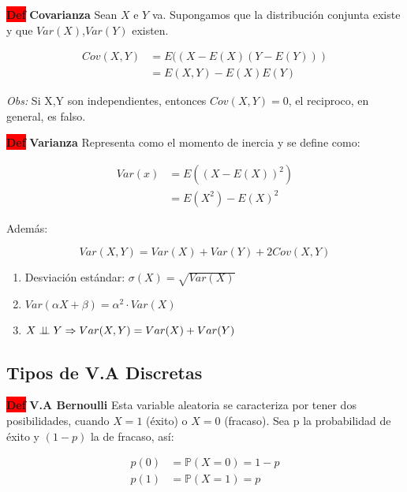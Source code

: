 \documentclass[letterpaper,10.5pt,twocolumn]{article} %
\newcommand{\Proba}{\mathbb{P} }
\newcommand{\hlc}[2][yellow]{ \colorbox{#1}{#2} }
\newcommand{\Def}{\hlc[red]{\bfseries Def}}
\newcommand{\independent}{\perp\mkern-9.5mu\perp}
\begin{document}
\Def \textbf{Covarianza} Sean $X$ e $Y$ va. Supongamos que la distribución conjunta existe y que $Var(X)$,$Var(Y )$ existen. 

\begin{align*}
    Cov(X,Y ) &= E((X - E(X)(Y - E(Y )))\\
    &= E(X,Y ) - E(X)E(Y )
\end{align*}

\textit{Obs:} Si X,Y son independientes, entonces $Cov(X,Y) = 0$,
el reciproco, en general, es falso.


\Def \textbf{Varianza} Representa como el momento de inercia y se define como:

\begin{align*}
    Var(x) &= E\left( (X - E(X))^2\right)\\
    &= E(X^2) - E(X)^2
\end{align*}

Además:

\begin{equation*}
    Var(X,Y)= Var(X) + Var(Y) + 2Cov(X,Y)
\end{equation*}

\begin{enumerate}[label={(\textit{\arabic*})}, leftmargin=*, itemsep=0pt]
    \item Desviación estándar: $\sigma(X)=\sqrt{Var(X)} $
    \item $Var(\alpha X + \beta) = \alpha^2 \cdot Var(X) $
    \item $X\independent Y \Rightarrow Var(X,Y) = Var(X) + Var(Y) $
\end{enumerate}


\subsection{Tipos de V.A Discretas}

\Def \textbf{V.A Bernoulli} Esta variable aleatoria se caracteriza por tener dos posibilidades, cuando $X = 1$ (éxito) o $X = 0$ (fracaso). Sea p la probabilidad de éxito y $(1-p)$ la de fracaso, así:

\begin{align*}
    p(0) &= \Proba (X=0) = 1-p\\
    p(1) &= \Proba (X=1) = p
\end{align*}
\end{document}
